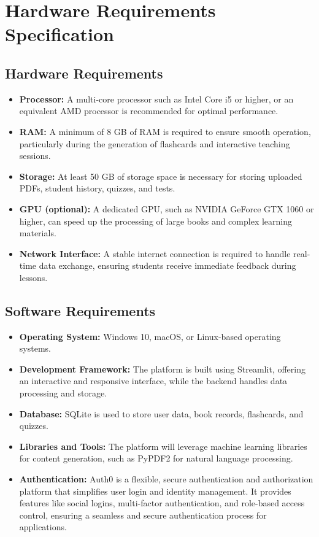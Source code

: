 \documentclass{report}
\begin{document}
\section{Hardware Requirements Specification}

\subsection{Hardware Requirements}
\begin{itemize}
    \item \textbf{Processor:} A multi-core processor such as Intel Core i5 or higher, or an equivalent AMD processor is recommended for optimal performance.
    \item \textbf{RAM:} A minimum of 8 GB of RAM is required to ensure smooth operation, particularly during the generation of flashcards and interactive teaching sessions.
    \item \textbf{Storage:} At least 50 GB of storage space is necessary for storing uploaded PDFs, student history, quizzes, and tests.
    \item \textbf{GPU (optional):} A dedicated GPU, such as NVIDIA GeForce GTX 1060 or higher, can speed up the processing of large books and complex learning materials.
    \item \textbf{Network Interface:} A stable internet connection is required to handle real-time data exchange, ensuring students receive immediate feedback during lessons.
\end{itemize}

\subsection{Software Requirements}
\begin{itemize}
    \item \textbf{Operating System:} Windows 10, macOS, or Linux-based operating systems.
    \item \textbf{Development Framework:} The platform is built using Streamlit, offering an interactive and responsive interface, while the backend handles data processing and storage.
    \item \textbf{Database:} SQLite is used to store user data, book records, flashcards, and quizzes.
    \item \textbf{Libraries and Tools:} The platform will leverage machine learning libraries for content generation, such as PyPDF2 for natural language processing.
    \item \textbf{Authentication:} Auth0 is a flexible, secure authentication and authorization platform that simplifies user login and identity management. It provides features like social logins, multi-factor authentication, and role-based access control, ensuring a seamless and secure authentication process for applications.
\end{itemize}
\end{document}
